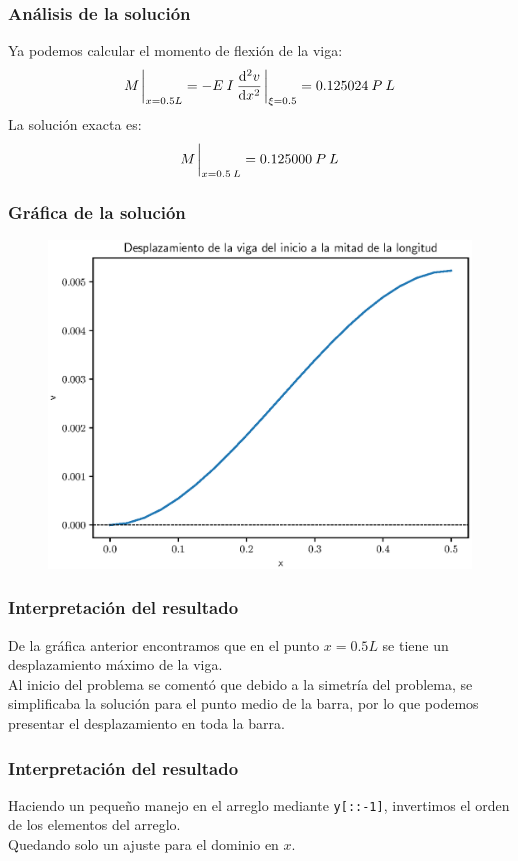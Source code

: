 \documentclass[12pt]{beamer}
\begin{document}
\begin{frame}
\frametitle{Análisis de la solución}
Ya podemos calcular el momento de flexión de la viga:
\pause
\begin{align*}
M \eval_{x=0.5 L} = - E \: I \: \dv[2]{v}{x} \eval_{\xi=0.5} = 0.125024 \: P \: L
\end{align*}
\pause
La solución exacta es:
\pause
\begin{align*}
M \eval_{x=0.5 \: L} = 0.125000 \: P \: L
\end{align*}
\end{frame}
\begin{frame}
\frametitle{Gráfica de la solución}
\begin{figure}
    \centering
    \includegraphics[scale=0.55]{Imagenes/plot_CDF_Dif_Fin_Ejercicio_02_01.eps}
\end{figure}
\end{frame}
\begin{frame}
\frametitle{Interpretación del resultado}
De la gráfica anterior encontramos que en el punto $x = 0.5 L$ se tiene un desplazamiento máximo de la viga.
\\
\bigskip
\pause
Al inicio del problema se comentó que debido a la simetría del problema, se simplificaba la solución para el punto medio de la barra, \pause por lo que podemos presentar el desplazamiento en toda la barra.
\end{frame}
\begin{frame}
\frametitle{Interpretación del resultado}
Haciendo un pequeño manejo en el arreglo  mediante \texttt{y[::-1]}, invertimos el orden de los elementos del arreglo.
\\
\bigskip
\pause
Quedando solo un ajuste para el dominio en $x$.
\end{frame}
\end{document}
